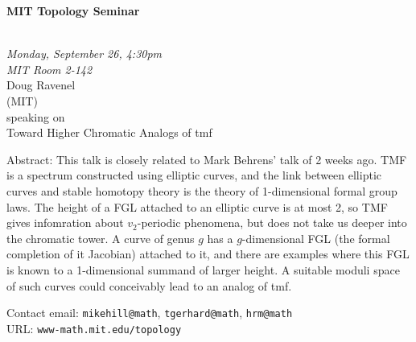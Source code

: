 \documentclass{slides}
\begin{document}
\begin{center}

{\fontsize {54pt}{40pt}\selectfont

\textrm{
{\textbf{MIT Topology Seminar}}}
}\\
\vspace{1cm}
{\large\textrm{\emph{Monday, September 26, 4:30pm\\MIT Room 2-142}}}\\
\vspace{1cm}
\textrm{{\LARGE Doug Ravenel  \\[.5cm](MIT)}}\\
\vspace{1cm} %
\textrm{speaking on}\\ %
\vspace{5mm}
\textrm{{\LARGE Toward Higher Chromatic Analogs of tmf}}\\
\end{center}
\vspace{1cm}
{\small
Abstract:  This talk is closely related to Mark Behrens' talk of 2 weeks ago.
TMF is a spectrum constructed using elliptic curves, and the link between
elliptic curves and stable homotopy theory is the theory of 1-dimensional
formal group laws.  The height of a FGL attached to an elliptic curve is at
most 2, so TMF gives infomration about $v_2$-periodic phenomena, but does not
take us deeper into the chromatic tower.  A curve of genus $g$ has a
$g$-dimensional FGL (the formal completion of it Jacobian) attached to it, and
there are examples where this FGL is known to a
1-dimensional summand of larger height.  A suitable moduli space of such curves
could conceivably lead to an analog of tmf.

\textrm{Contact email: } \texttt{mikehill@math}, \texttt{tgerhard@math},
\texttt{hrm@math}\\
\textrm{URL: } \texttt{www-math.mit.edu/topology}
}
\end{document}
